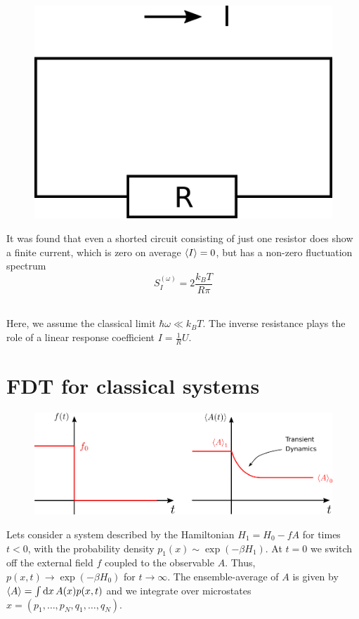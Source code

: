 \documentclass{/home/ben/Templates/notebook}
\begin{document}
	\begin{minipage}{0.4\linewidth}
		\begin{figure}[H]
			\centering
			\includegraphics[width=0.9\linewidth]{Pics/shortedcircuit}
			\label{fig:shortedcircuit}
		\end{figure}
	\end{minipage}
	\hspace*{0.05\linewidth}
	\begin{minipage}{0.48\linewidth}
		It was found that even a shorted circuit consisting of just one resistor does show a finite current, which is zero on average $\expval{I} = 0$, but has a non-zero fluctuation spectrum
		\begin{equation}
		S_I^{(\omega)} = 2 \frac{k_B T}{R \pi}
		\end{equation}
	\end{minipage}
	\\ 
	
	Here, we assume the classical limit $\hbar \omega \ll k_B T$. The inverse resistance plays the role of a linear response coefficient $I = \frac{1}{R} U$.
	
	
	\newpage
	\section{FDT for classical systems}
	
	\begin{figure}[H]
		\centering
		\includegraphics[width=0.9\linewidth]{Pics/derivationFDT}
		\label{fig:derivationfdt}
	\end{figure}
	Lets consider a system described by the Hamiltonian $H_1 = H_0 - f A$ for times $t < 0$, with the probability density $p_1(x) \sim \exp(- \beta H_1)$. At $t = 0$ we switch off the external field $f$ coupled to the observable $A$. Thus, $p(x,t) \to \exp(-\beta H_0)$ for $t \to \infty$. The ensemble-average of $A$ is given by $\expval{A} = \int{\dd{x} A(x) p(x,t)}$ and we integrate over microstates $x = (p_1, \dots, p_N, q_1, \dots, q_N)$. 
	
\end{document}
